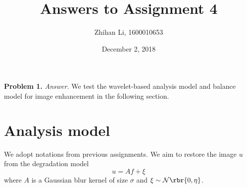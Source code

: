\documentclass[english, nochinese]{pnote}
\title{Answers to Assignment 4}
\author{Zhihan Li, 1600010653}
\date{December 2, 2018}
\begin{document}
\maketitle

\textbf{Problem 1.} \textit{Answer.} We test the wavelet-based analysis model and balance model for image enhancement in the following section.

\section{Analysis model}

We adopt notations from previous assignments. We aim to restore the image $u$ from the degradation model
\begin{equation}
u = A f + \xi
\end{equation}
where $A$ is a Gaussian blur kernel of size $\sigma$ and $ \xi \sim \mathcal{N} \rbr{ 0, \eta } $.
\end{document}

